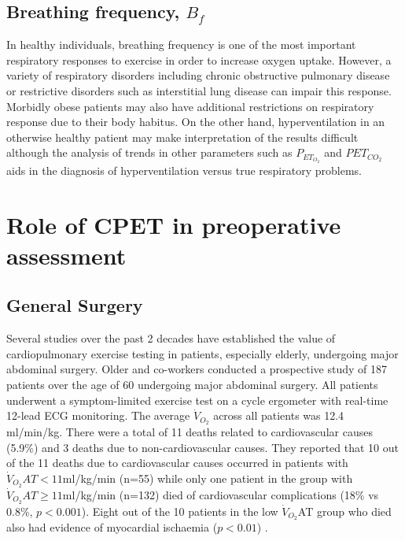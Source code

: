 \subsection[Breathing frequency]{Breathing frequency, $B_f$}
In healthy individuals, breathing frequency is one of the most important respiratory responses to exercise in order to increase oxygen uptake. 
However, a variety of respiratory disorders including chronic obstructive pulmonary disease or restrictive disorders such as interstitial lung disease can impair this response. 
Morbidly obese patients may also have additional restrictions on respiratory response due to their body habitus. 
On the other hand, hyperventilation in an otherwise healthy patient may make interpretation of the results difficult although the analysis of trends in other parameters such as $P_{ET_{O_2}}$ and $P{ET_{CO_2}}$ aids in the diagnosis of hyperventilation versus true respiratory problems.

\section{Role of CPET in preoperative assessment}
\label{sec:cpx_roleInAssessment}
\subsection{General Surgery}

Several studies over the past 2 decades have established the value of cardiopulmonary exercise testing in patients, especially elderly, undergoing major abdominal surgery. 
Older and co-workers conducted a prospective study of 187 patients over the age of 60 undergoing major abdominal surgery. 
All patients underwent a symptom-limited exercise test on a cycle ergometer with real-time 12-lead ECG monitoring. 
The average $\dot{V}_{O_2}$ across all patients was 12.4 ml/min/kg. 
There were a total of 11 deaths related to cardiovascular causes (5.9\%) and 3 deaths due to non-cardiovascular causes. 
They reported that 10 out of the 11 deaths due to cardiovascular causes occurred in patients with $\dot{V}_{O_2}AT<11$ml/kg/min (n=55) while only one patient in the group with $\dot{V}_{O_2}AT\geq11$ml/kg/min (n=132) died of cardiovascular complications (18\% vs 0.8\%, $p<0.001$). 
Eight out of the 10 patients in the low $\dot{V}_{O_2}$AT group who died also had evidence of myocardial ischaemia ($p<0.01$) \parencite{older_preoperative_1993}. 

